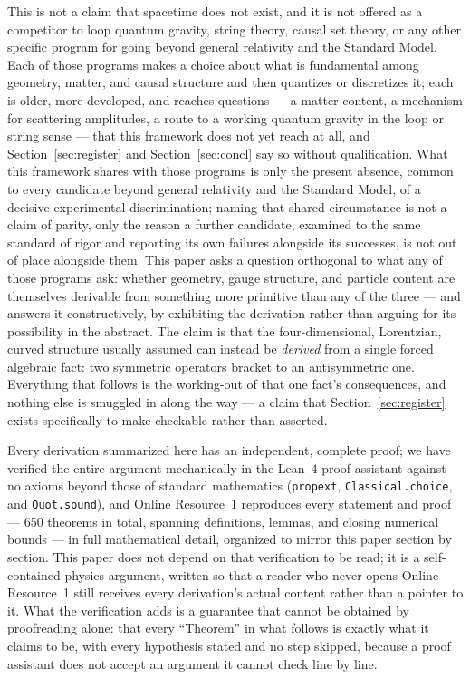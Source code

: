 \documentclass[pdflatex,sn-mathphys-num]{sn-jnl}
\theoremstyle{thmstyleone}
\theoremstyle{thmstylethree}
\theoremstyle{thmstyletwo}
\begin{document}
This is not a claim that spacetime does not exist, and it is not offered
as a competitor to loop quantum gravity, string theory, causal set
theory, or any other specific program for going beyond general relativity
and the Standard Model. Each of those programs makes a choice about what
is fundamental among geometry, matter, and causal structure and then
quantizes or discretizes it; each is older, more developed, and reaches
questions — a matter content, a mechanism for scattering amplitudes, a
route to a working quantum gravity in the loop or string sense — that
this framework does not yet reach at all, and Section~\ref{sec:register}
and Section~\ref{sec:concl} say so without qualification. What this
framework shares with those programs is only the present absence, common
to every candidate beyond general relativity and the Standard Model, of a
decisive experimental discrimination; naming that shared circumstance is
not a claim of parity, only the reason a further candidate, examined to
the same standard of rigor and reporting its own failures alongside its
successes, is not out of place alongside them. This paper asks a
question orthogonal to what any of those programs ask: whether geometry,
gauge structure, and particle content are themselves derivable from
something more primitive than any of the three — and answers it
constructively, by exhibiting the derivation rather than arguing for its
possibility in the abstract. The claim is that the four-dimensional,
Lorentzian, curved structure usually assumed can instead be
\emph{derived} from a single forced algebraic fact: two symmetric
operators bracket to an antisymmetric one. Everything that follows is
the working-out of that one fact's consequences, and nothing else is
smuggled in along the way — a claim that Section~\ref{sec:register}
exists specifically to make checkable rather than asserted.

Every derivation summarized here has an independent, complete proof; we
have verified the entire argument mechanically in the Lean~4 proof
assistant against no axioms beyond those of standard mathematics
(\texttt{propext}, \texttt{Classical.choice}, and \texttt{Quot.sound}),
and Online Resource~1 reproduces every statement and proof — 650
theorems in total, spanning definitions, lemmas, and closing numerical
bounds — in full mathematical detail, organized to mirror this paper
section by section. This paper does not depend on that verification to
be read; it is a self-contained physics argument, written so that a
reader who never opens Online Resource~1 still receives every
derivation's actual content rather than a pointer to it. What the verification adds is a guarantee
that cannot be obtained by proofreading alone: that every ``Theorem'' in
what follows is exactly what it claims to be, with every hypothesis
stated and no step skipped, because a proof assistant does not accept an
argument it cannot check line by line.
\end{document}
